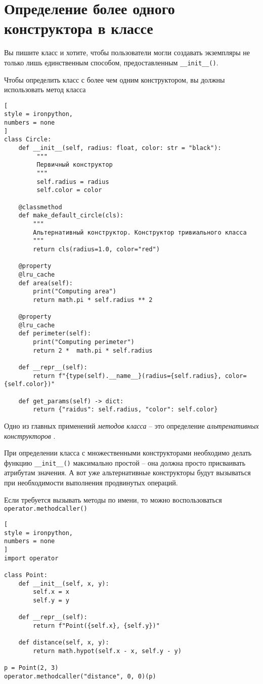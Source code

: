 \documentclass[%
	11pt,
	a4paper,
	utf8,
		]{article}
\begin{document}
\section{Определение более одного конструктора в классе}

Вы пишите класс и хотите, чтобы пользователи могли создавать экземпляры не только лишь единственным способом, предоставленным \verb|__init__()|.

Чтобы определить класс с более чем одним конструктором, вы должны использовать метод класса
\begin{lstlisting}[
style = ironpython,
numbers = none
]
class Circle:
    def __init__(self, radius: float, color: str = "black"):
         """
         Первичный конструктор
         """
         self.radius = radius
         self.color = color
    
    @classmethod
    def make_default_circle(cls):
        """
        Альтернативный конструктор. Конструктор тривиального класса
        """
        return cls(radius=1.0, color="red")
    
    @property
    @lru_cache
    def area(self):
        print("Computing area")
        return math.pi * self.radius ** 2
    
    @property
    @lru_cache
    def perimeter(self):
        print("Computing perimeter")
        return 2 *  math.pi * self.radius
    
    def __repr__(self):
        return f"{type(self).__name__}(radius={self.radius}, color={self.color})"
    
    def get_params(self) -> dict:
        return {"raidus": self.radius, "color": self.color}
\end{lstlisting}

Одно из главных применений \emph{методов класса} -- это определение \emph{альтренативных конструкторов} \cite[]{beazley:python_cookbook-2019}. 

При определении класса с множественными конструкторами необходимо делать функцию \verb|__init__()| максимально простой -- она должна просто присваивать атрибутам значения. А вот уже альтернативные конструкторы будут вызываться при необходимости выполнения продвинутых операций.

Если требуется вызывать методы по имени, то можно воспользоваться \texttt{operator.methodcaller()}
\begin{lstlisting}[
style = ironpython,
numbers = none
]
import operator

class Point:
    def __init__(self, x, y):
        self.x = x
        self.y = y
    
    def __repr__(self):
        return f"Point({self.x}, {self.y})"
        
    def distance(self, x, y):
        return math.hypot(self.x - x, self.y - y)

p = Point(2, 3)
operator.methodcaller("distance", 0, 0)(p)
\end{lstlisting}
\end{document}

